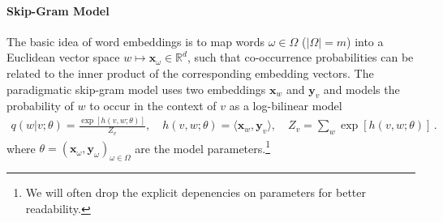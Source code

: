 \documentclass{article}
\renewcommand{\Re}{{\mathbb R}}
\newcommand{\x}{{\mathbf x}}
\newcommand{\y}{{\mathbf y}}
\begin{document}
\paragraph{Skip-Gram Model} The basic idea of word embeddings is to map words $\omega \in \Omega$ ($|\Omega|=m$) into a Euclidean vector space $w \mapsto \x_\omega \in \Re^d$, such that co-occurrence probabilities can be related to the inner product of the corresponding embedding vectors. The paradigmatic skip-gram model \cite{mikolov2013distributed} uses two embeddings $\x_w$ and $\y_v$ and models the probability of $w$ to occur in the context of $v$ as a log-bilinear model
\begin{align}
q(w | v; \theta) = \frac{\exp[h(v,w; \theta)]}{Z_v}, \quad 
h(v,w; \theta) = \langle \x_w, \y_v \rangle, \quad 
Z_v = \sum_{w} \exp[h(v,w; \theta)]\,.
\label{eq:bilinear}
\end{align}
where $\theta = (\x_\omega, \y_\omega)_{\omega \in \Omega}$ are the model parameters.\footnote{We will often drop the explicit depenencies on parameters for better readability.}
\end{document}
